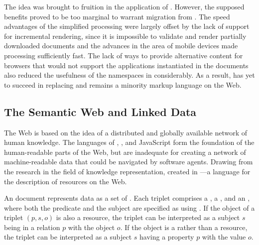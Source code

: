 The idea was brought to fruition in the  application of
. However, the supposed benefits proved to be too marginal to
warrant migration from . The speed advantages of the simplified
processing were largely offset by the lack of support for incremental rendering,
since it is impossible to validate and render partially downloaded
 documents and the advances in the area of mobile devices made
 processing sufficiently fast. The lack of ways to provide
alternative content for browsers that would not support the 
applications instantiated in the  documents also reduced the
usefulness of the  namespaces in  considerably. As
a result,  has yet to succeed in replacing  and
remains a minority markup language on the Web.


\subsection{The Semantic Web and Linked Data}\label{sec:semantic-web}
The Web is based on the idea of a distributed and globally available network of
human knowledge. The languages of , , 
and JavaScript form the foundation of the human-readable parts of the Web, but
are inadequate for creating a network of machine-readable data that could be
navigated by software agents.
Drawing from the research in the field of knowledge representation,
 created  in \citeyear{lassira99}---a language for the
description of resources on the Web.

An  document represents data as a set of %
. Each triplet comprises a
, a %
, and an ,
where both the predicate and the subject are specified as 
 using . If the object of a triplet
$(p,s,o)$ is also a resource, the triplet can be interpreted as a subject $s$
being in a relation $p$ with the object $o$. If the object is a   rather than a resource, the triplet can be
interpreted as a subject $s$ having a property $p$ with the value $o$.

